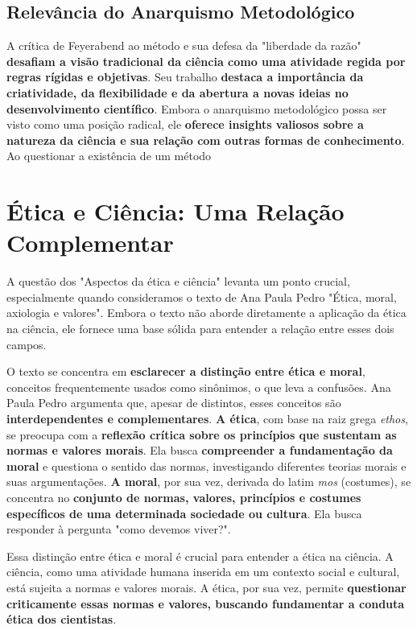 \documentclass{article} %
\begin{document}
\subsection{Relevância do Anarquismo Metodológico}

A crítica de Feyerabend ao método e sua defesa da "liberdade da razão" \textbf{desafiam a visão tradicional da ciência como uma atividade regida por regras rígidas e objetivas}.  Seu trabalho \textbf{destaca a importância da criatividade, da flexibilidade e da abertura a novas ideias no desenvolvimento científico}. Embora o anarquismo metodológico possa ser visto como uma posição radical, ele \textbf{oferece insights valiosos sobre a natureza da ciência e sua relação com outras formas de conhecimento}. Ao questionar a existência de um método

\section{Ética e Ciência: Uma Relação Complementar}

A questão dos "Aspectos da ética e ciência" levanta um ponto crucial, especialmente quando consideramos o texto de Ana Paula Pedro "Ética, moral, axiologia e valores".  Embora o texto não aborde diretamente a aplicação da ética na ciência, ele fornece uma base sólida para entender a relação entre esses dois campos.

O texto se concentra em \textbf{esclarecer a distinção entre ética e moral}, conceitos frequentemente usados como sinônimos, o que leva a confusões. Ana Paula Pedro argumenta que, apesar de distintos, esses conceitos são \textbf{interdependentes e complementares}. \textbf{A ética}, com base na raiz grega \textit{ethos},  se preocupa com a \textbf{reflexão crítica sobre os princípios que sustentam as normas e valores morais}. Ela busca \textbf{compreender a fundamentação da moral} e questiona o sentido das normas, investigando diferentes teorias morais e suas argumentações. \textbf{A moral}, por sua vez, derivada do latim \textit{mos} (costumes),  se concentra no \textbf{conjunto de normas, valores, princípios e costumes específicos de uma determinada sociedade ou cultura}. Ela  busca responder à pergunta "como devemos viver?".

Essa distinção entre ética e moral é crucial para entender a ética na ciência. A ciência, como uma atividade humana inserida em um contexto social e cultural, está sujeita a normas e valores morais. A ética, por sua vez,  permite  \textbf{questionar criticamente essas normas e valores, buscando  fundamentar a conduta ética dos cientistas}.
\end{document}
